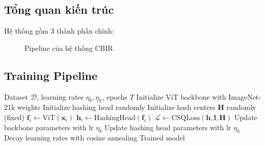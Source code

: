 \documentclass[12pt,a4paper]{article}
\begin{document}
\subsection{Tổng quan kiến trúc}

Hệ thống gồm 3 thành phần chính:

\begin{figure}[H]
\centering
{}
\caption{Pipeline của hệ thống CBIR}
\label{fig:pipeline}
\end{figure}

\subsection{Training Pipeline}

\begin{algorithm}[H]
\caption{Training ViT + Deep Hashing}
\label{alg:training}
\begin{algorithmic}[1]
\REQUIRE Dataset $\mathcal{D}$, learning rates $\eta_b, \eta_h$, epochs $T$
\STATE Initialize ViT backbone with ImageNet-21k weights
\STATE Initialize hashing head randomly
\STATE Initialize hash centers $\mathbf{H}$ randomly (fixed)
        \STATE $\mathbf{f}_i \leftarrow \text{ViT}(\mathbf{x}_i)$ 
        \STATE $\mathbf{h}_i \leftarrow \text{HashingHead}(\mathbf{f}_i)$ 
        \STATE $\mathcal{L} \leftarrow \text{CSQLoss}(\mathbf{h}, \mathbf{l}, \mathbf{H})$ 
        \STATE Update backbone parameters with lr $\eta_b$
        \STATE Update hashing head parameters with lr $\eta_h$
    \ENDFOR
    \STATE Decay learning rates with cosine annealing
\ENDFOR
\RETURN Trained model
\end{algorithmic}
\end{algorithm}
\end{document}
